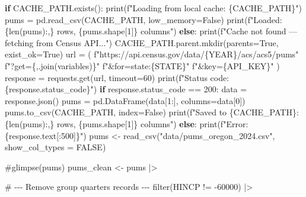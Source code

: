 \documentclass[
  letterpaper,
  DIV=11,
  numbers=noendperiod]{scrartcl}
\newenvironment{Shaded}{\begin{snugshade}}{\end{snugshade}}
\newcommand{\AttributeTok}[1]{\textcolor[rgb]{0.40,0.45,0.13}{#1}}
\newcommand{\CommentTok}[1]{\textcolor[rgb]{0.37,0.37,0.37}{#1}}
\newcommand{\ConstantTok}[1]{\textcolor[rgb]{0.56,0.35,0.01}{#1}}
\newcommand{\ControlFlowTok}[1]{\textcolor[rgb]{0.00,0.23,0.31}{\textbf{#1}}}
\newcommand{\DecValTok}[1]{\textcolor[rgb]{0.68,0.00,0.00}{#1}}
\newcommand{\FunctionTok}[1]{\textcolor[rgb]{0.28,0.35,0.67}{#1}}
\newcommand{\NormalTok}[1]{\textcolor[rgb]{0.00,0.23,0.31}{#1}}
\newcommand{\OtherTok}[1]{\textcolor[rgb]{0.00,0.23,0.31}{#1}}
\newcommand{\SpecialCharTok}[1]{\textcolor[rgb]{0.37,0.37,0.37}{#1}}
\newcommand{\StringTok}[1]{\textcolor[rgb]{0.13,0.47,0.30}{#1}}
\begin{document}
\begin{Shaded}
\begin{Highlighting}[]
\ControlFlowTok{if} \FunctionTok{CACHE\_PATH.exists}\NormalTok{()}\SpecialCharTok{:}
    \FunctionTok{print}\NormalTok{(f}\StringTok{"Loading from local cache: \{CACHE\_PATH\}"}\NormalTok{)}
\NormalTok{    pums }\OtherTok{=} \FunctionTok{pd.read\_csv}\NormalTok{(CACHE\_PATH, }\AttributeTok{low\_memory=}\NormalTok{False)}
    \FunctionTok{print}\NormalTok{(f}\StringTok{"Loaded: \{len(pums):,\} rows, \{pums.shape[1]\} columns"}\NormalTok{)}
\ControlFlowTok{else}\SpecialCharTok{:}
    \FunctionTok{print}\NormalTok{(f}\StringTok{"Cache not found — fetching from Census API..."}\NormalTok{)}
    \FunctionTok{CACHE\_PATH.parent.mkdir}\NormalTok{(}\AttributeTok{parents=}\NormalTok{True, }\AttributeTok{exist\_ok=}\NormalTok{True)}
\NormalTok{    url }\OtherTok{=}\NormalTok{ (}
\NormalTok{        f}\StringTok{"https://api.census.gov/data/\{YEAR\}/acs/acs5/pums"}
\NormalTok{        f}\StringTok{"?get=\{\textquotesingle{},\textquotesingle{}.join(variables)\}"}
\NormalTok{        f}\StringTok{"\&for=state:\{STATE\}"}
\NormalTok{        f}\StringTok{"\&key=\{API\_KEY\}"}
\NormalTok{    )}
\NormalTok{    response }\OtherTok{=} \FunctionTok{requests.get}\NormalTok{(url, }\AttributeTok{timeout=}\DecValTok{60}\NormalTok{)}
    \FunctionTok{print}\NormalTok{(f}\StringTok{"Status code: \{response.status\_code\}"}\NormalTok{)}
    \ControlFlowTok{if}\NormalTok{ response.status\_code }\SpecialCharTok{==} \DecValTok{200}\SpecialCharTok{:}
\NormalTok{        data }\OtherTok{=} \FunctionTok{response.json}\NormalTok{()}
\NormalTok{        pums }\OtherTok{=} \FunctionTok{pd.DataFrame}\NormalTok{(data[}\DecValTok{1}\SpecialCharTok{:}\NormalTok{], }\AttributeTok{columns=}\NormalTok{data[}\DecValTok{0}\NormalTok{])}
        \FunctionTok{pums.to\_csv}\NormalTok{(CACHE\_PATH, }\AttributeTok{index=}\NormalTok{False)}
        \FunctionTok{print}\NormalTok{(f}\StringTok{"Saved to \{CACHE\_PATH\}: \{len(pums):,\} rows, \{pums.shape[1]\} columns"}\NormalTok{)}
    \ControlFlowTok{else}\SpecialCharTok{:}
        \FunctionTok{print}\NormalTok{(f}\StringTok{"Error: \{response.text[:500]\}"}\NormalTok{)}
\NormalTok{pums }\OtherTok{\textless{}{-}} \FunctionTok{read\_csv}\NormalTok{(}\StringTok{"data/pums\_oregon\_2024.csv"}\NormalTok{, }\AttributeTok{show\_col\_types =} \ConstantTok{FALSE}\NormalTok{)}

\CommentTok{\#glimpse(pums)}
\NormalTok{pums\_clean }\OtherTok{\textless{}{-}}\NormalTok{ pums }\SpecialCharTok{|\textgreater{}}

  \CommentTok{\# {-}{-}{-} Remove group quarters records {-}{-}{-}}
  \FunctionTok{filter}\NormalTok{(HINCP }\SpecialCharTok{!=} \SpecialCharTok{{-}}\DecValTok{60000}\NormalTok{) }\SpecialCharTok{|\textgreater{}}


\end{Highlighting}
\end{Shaded}
\end{document}
